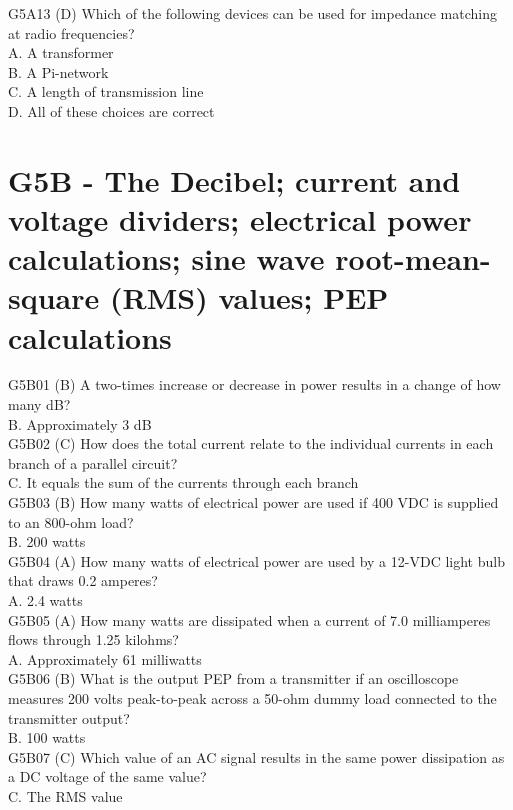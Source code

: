 \documentclass[12pt,letterpaper]{report}
\begin{document}
G5A13 (D) Which of the following devices can be used for impedance matching at radio frequencies?\\
A. A transformer\\
B. A Pi-network\\
C. A length of transmission line\\
D. All of these choices are correct\\

\section{G5B - The Decibel; current and voltage dividers; electrical power calculations; sine wave root-mean-square (RMS) values; PEP calculations}

G5B01 (B) A two-times increase or decrease in power results in a change of how many dB?\\
B. Approximately 3 dB\\

G5B02 (C) How does the total current relate to the individual currents in each branch of a parallel circuit?\\
C. It equals the sum of the currents through each branch \\

G5B03 (B) How many watts of electrical power are used if 400 VDC is supplied to an 800-ohm load?\\
B. 200 watts\\

G5B04 (A) How many watts of electrical power are used by a 12-VDC light bulb that draws 0.2 amperes?\\
A. 2.4 watts\\

G5B05 (A) How many watts are dissipated when a current of 7.0 milliamperes flows through 1.25 kilohms?\\
A. Approximately 61 milliwatts\\

G5B06 (B) What is the output PEP from a transmitter if an oscilloscope measures 200 volts peak-to-peak across a 50-ohm dummy load connected to the transmitter output?\\
B. 100 watts\\

G5B07 (C) Which value of an AC signal results in the same power dissipation as a DC voltage of the same value? \\
C. The RMS value \\
\end{document}
